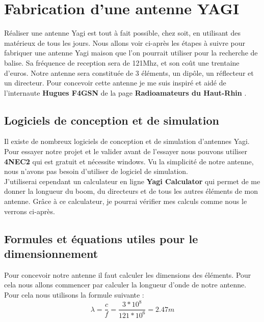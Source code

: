 \documentclass[12pt, a4paper]{article}
\begin{document}
\section{Fabrication d'une antenne YAGI}
Réaliser une antenne Yagi est tout à fait possible, chez 
soit, en utilisant des matérieux de tous les jours. 
Nous allons voir ci-après les étapes à suivre 
pour fabriquer une antenne Yagi maison que l'on 
pourrait utiliser pour la recherche de balise. Sa 
fréquence de reception sera de 121Mhz, et son coût 
une trentaine d'euros. Notre antenne sera constituée
de 3 éléments, un dipôle, un réflecteur et un directeur.
Pour concevoir cette antenne je me suis inspiré et aidé
de l'internaute \textbf{Hugues F4GSN} de la page 
\textbf{Radioamateurs du Haut-Rhin} \cite{r5}.
\subsection{Logiciels de conception et de simulation}
Il existe de nombreux logiciels de conception et de
simulation d'antennes Yagi. Pour essayer notre 
projet et le valider avant de l'essayer nous pouvons 
utiliser \textbf{4NEC2} qui est gratuit et nécessite 
windows. Vu la simplicité de notre antenne, nous
n'avons pas besoin d'utiliser de logiciel de simulation.\\

J'utiliserai cependant un calculateur en ligne \textbf{Yagi Calculator}
qui permet de me donner la longueur du boom, du directeurs 
et de tous les autres éléments de mon antenne. Grâce 
à ce calculateur, je pourrai vérifier mes calculs comme 
nous le verrons ci-après.

\subsection{Formules et équations utiles pour le dimensionnement}
Pour concevoir notre antenne il faut calculer 
les dimensions des éléments. Pour cela nous allons 
commencer par calculer la longueur d'onde de notre
antenne. Pour cela nous utilisons la formule suivante :\\

\begin{equation}
    \lambda = \frac{c}{f}
    = \frac{3*10^8}{121*10^6}
    = 2.47m
\end{equation}
\end{document}
